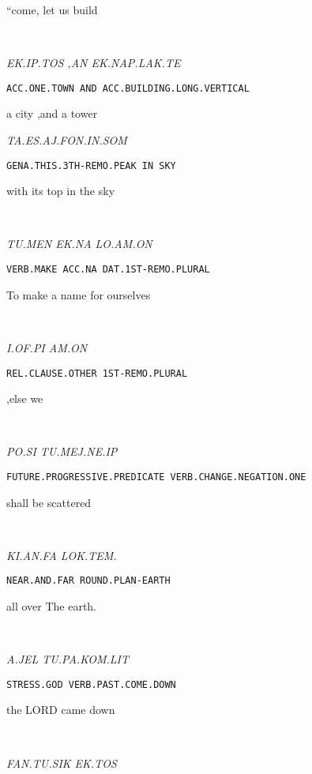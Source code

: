 {“come, let us build                                                                          
\drie
 

\ek\ip\tos\comma~\an~\ek\nap\lak\te

{\it EK.IP.TOS		,AN	EK.NAP.LAK.TE	 }

{\tt ACC.ONE.TOWN		AND	ACC.BUILDING.LONG.VERTICAL }

a city			,and 	a tower	 
\drie

\ta\es\aj\fon\Atlanin\som

{\it TA.ES.AJ.FON.IN.SOM }

{\tt GENA.THIS.3TH-REMO.PEAK	IN	SKY }

with its top 				in           the sky 
\drie

  

\tu\men~	\ek\na~		\lo\am\on 

{\it TU.MEN	EK.NA		LO.AM.ON }

{\tt VERB.MAKE	ACC.NA		DAT.1ST-REMO.PLURAL	 }

To make 	a name 		for ourselves		 

\drie

 

\Atlani\of\Atlanpi ~ \am\on

{\it I.OF.PI			AM.ON }

{\tt REL.CLAUSE.OTHER	1ST-REMO.PLURAL }

,else 			we 

\drie
 

\po\si~\tu\mej\Atlanne\ip

{\it PO.SI			  TU.MEJ.NE.IP		 

{\tt FUTURE.PROGRESSIVE.PREDICATE    VERB.CHANGE.NEGATION.ONE        }

shall be			    scattered			
\drie 


\ki\an\fa ~ \lok\tem\period

{\it KI.AN.FA		LOK.TEM. }

{\tt NEAR.AND.FAR		ROUND.PLAN-EARTH }

all over			The earth.
\drie 
 
\Atlana\jel ~ \tu\pa\kom\lit 

{\it A.JEL			TU.PA.KOM.LIT			 }

{\tt STRESS.GOD         VERB.PAST.COME.DOWN		}

the LORD 		came down 			

\drie 

\fan\tu\sik ~ \ek\tos

{\it FAN.TU.SIK		EK.TOS }

}}

